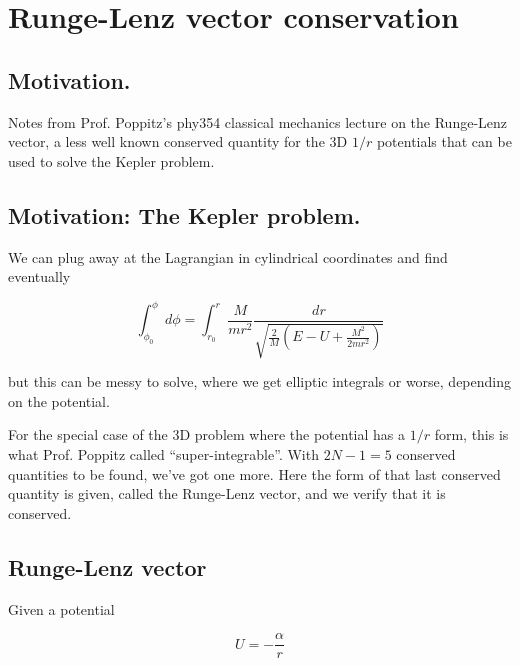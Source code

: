 %
%

\chapter{Runge-Lenz vector conservation}
\label{chap:RungeLenz}
{}
\date{Feb 11, 2012}

\beginArtWithToc

\section{Motivation.}

Notes from Prof. Poppitz's phy354 classical mechanics lecture on the Runge-Lenz vector, a less well known conserved quantity for the 3D $1/r$ potentials that can be used to solve the Kepler problem.

\section{Motivation: The Kepler problem.}

We can plug away at the Lagrangian in cylindrical coordinates and find eventually

\begin{equation}\label{eqn:RungeLenz:10}
\int_{\phi_0}^\phi d\phi = \int_{r_0}^r \frac{M}{m r^2} \frac{dr}{\sqrt{\frac{2}{M} ( E - U + \frac{M^2}{2 m r^2}) }}
\end{equation}

but this can be messy to solve, where we get elliptic integrals or worse, depending on the potential.

For the special case of the 3D problem where the potential has a $1/r$ form, this is what Prof. Poppitz called ``super-integrable''.  With $2N - 1 = 5$ conserved quantities to be found, we've got one more.  Here the form of that last conserved quantity is given, called the Runge-Lenz vector, and we verify that it is conserved.

\section{Runge-Lenz vector}

Given a potential

\begin{equation}\label{eqn:RungeLenz:30}
U = -\frac{\alpha}{r}
\end{equation}

